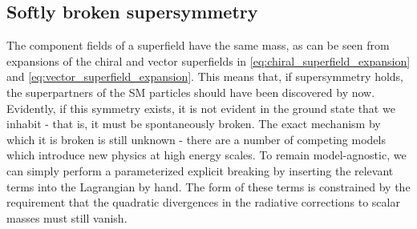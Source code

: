 \subsection{Softly broken supersymmetry}
The component fields of a superfield have the same mass, as can be seen from expansions of the chiral and vector superfields in \eqref{eq:chiral_superfield_expansion} and \eqref{eq:vector_superfield_expansion}. This means that, if supersymmetry holds, the superpartners of the SM particles should have been discovered by now. Evidently, if this symmetry exists, it is not evident in the ground state that we inhabit - that is, it must be spontaneously broken. The exact mechanism by which it is broken is still unknown - there are a number of competing models which introduce new physics at high energy scales. To remain model-agnostic, we can simply perform a parameterized explicit breaking by inserting the relevant terms into the Lagrangian by hand. The form of these terms is constrained by the requirement that the quadratic divergences in the radiative corrections to scalar masses must still vanish.

